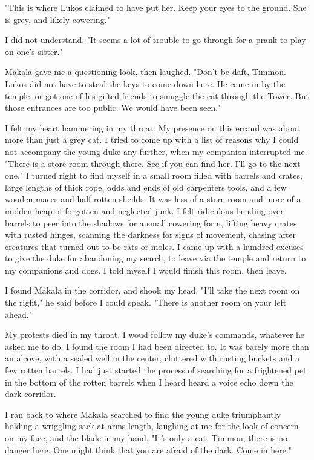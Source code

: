 \documentclass{article}
\begin{document}
"This is where Lukos claimed to have put her. Keep your eyes to the ground. She is grey, and likely cowering."

I did not understand. "It seems a lot of trouble to go through for a prank to play on one's sister."

Makala gave me a questioning look, then laughed. "Don't be daft, Timmon. Lukos did not have to steal the keys to come down here. He came in by the temple, or got one of his gifted friends to smuggle the cat through the Tower. But those entrances are too public. We would have been seen."

I felt my heart hammering in my throat. My presence on this errand was about more than just a grey cat. I tried to come up with a list of reasons why I could not accompany the young duke any further, when my companion interrupted me. "There is a store room through there. See if you can find her. I'll go to the next one." I turned right to find myself in a small room filled with barrels and crates, large lengths of thick rope, odds and ends of old carpenters tools, and a few wooden maces and half rotten sheilds. It was less of a store room and more of a midden heap of forgotten and neglected junk. I felt ridiculous bending over barrels to peer into the shadows for a small cowering form, lifting heavy crates with rusted hinges, scanning the darkness for signs of movement, chasing after creatures that turned out to be rats or moles. I came up with a hundred excuses to give the duke for abandoning my search, to leave via the temple and return to my companions and dogs. I told myself I would finish this room, then leave.

I found Makala in the corridor, and shook my head. "I'll take the next room on the right," he said before I could speak. "There is another room on your left ahead."

My protests died in my throat. I woud follow my duke's commands, whatever he asked me to do. I found the room I had been directed to. It was barely more than an alcove, with a sealed well in the center, cluttered with rusting buckets and a few rotten barrels. I had just started the process of searching for a frightened pet in the bottom of the rotten barrels when I heard heard a voice echo down the dark corridor. 

I ran back to where Makala searched to find the young duke triumphantly holding a wriggling sack at arms length, laughing at me for the look of concern on my face, and the blade in my hand. "It's only a cat, Timmon, there is no danger here. One might think that you are afraid of the dark. Come in here."
\end{document}
